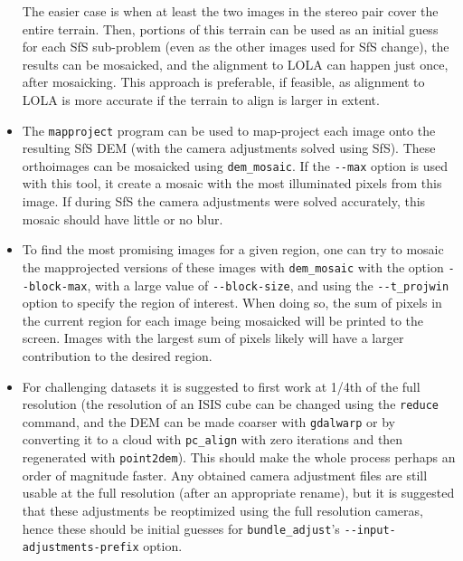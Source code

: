 \begin{itemize}{}
  The easier case is when at least the two images in the stereo pair
  cover the entire terrain. Then, portions of this terrain can be used
  as an initial guess for each SfS sub-problem (even as the other images
  used for SfS change), the results can be mosaicked, and the alignment
  to LOLA can happen just once, after mosaicking. This approach is
  preferable, if feasible, as alignment to LOLA is more accurate if the
  terrain to align is larger in extent.

\item The \texttt{mapproject} program can be used to map-project each image
  onto the resulting SfS DEM (with the camera adjustments solved using
  SfS). These orthoimages can be mosaicked using \texttt{dem\_mosaic}. If the
  \texttt{-\/-max} option is used with this tool, it create a mosaic with
  the most illuminated pixels from this image. If during SfS the camera
  adjustments were solved accurately, this mosaic should have little or no
  blur.

\item To find the most promising images for a given region, one can try
to mosaic the mapprojected versions of these images with
\texttt{dem\_mosaic} with the option \texttt{-\/-block-max}, with a
large value of \texttt{-\/-block-size}, and using the
\texttt{-\/-t\_projwin} option to specify the region of interest.  When
doing so, the sum of pixels in the current region for each image being
mosaicked will be printed to the screen. Images with the largest sum of
pixels likely will have a larger contribution to the desired region.

\item For challenging datasets it is suggested to first work at 1/4th of
the full resolution (the resolution of an ISIS cube can be changed using
the \texttt{reduce} command, and the DEM can be made coarser with
\texttt{gdalwarp} or by converting it to a cloud with \texttt{pc\_align}
with zero iterations and then regenerated with \texttt{point2dem}).
This should make the whole process perhaps an order of magnitude
faster. Any obtained camera adjustment files are still usable at the
full resolution (after an appropriate rename), but it is suggested that
these adjustments be reoptimized using the full resolution cameras,
hence these should be initial guesses for \texttt{bundle\_adjust}'s 
\texttt{-\/-input-adjustments-prefix} option.

\end{itemize}
